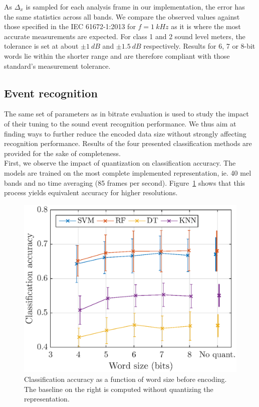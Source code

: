 \documentclass[final,3p,times,twocolumn]{elsarticle}
\begin{document}
As $\Delta_x$ is sampled for each analysis frame in our implementation, the error has the same statistics across all bands. We compare the observed values against those specified in the IEC 61672-1:2013 \cite{iec-norm2} for $f = 1~kHz$ as it is where the most accurate measurements are expected. For class 1 and 2 sound level meters, the tolerance is set at about $\pm 1~dB$ and $\pm 1.5~dB$ respectively. Results for 6, 7 or 8-bit words lie within the shorter range and are therefore compliant with those standard's measurement tolerance.

\subsection{Event recognition}

The same set of parameters as in bitrate evaluation is used to study the impact of their tuning to the sound event recognition performance. We thus aim at finding ways to further reduce the encoded data size without strongly affecting recognition performance. Results of the four presented classification methods are provided for the sake of completeness.\\

First, we observe the impact of quantization on classification accuracy. The models are trained on the most complete implemented representation, ie. 40 mel bands and no time averaging (85 frames per second). Figure~\ref{fig:class_mel_q} shows that this process yields equivalent accuracy for higher resolutions.\\

\begin{figure}[htbp]
	\centering
		\includegraphics[width=\columnwidth]{figures/class_mel_q.eps}
	\caption{Classification accuracy as a function of word size before encoding. The baseline on the right is computed without quantizing the representation.}
	\label{fig:class_mel_q}
\end{figure}
\end{document}
